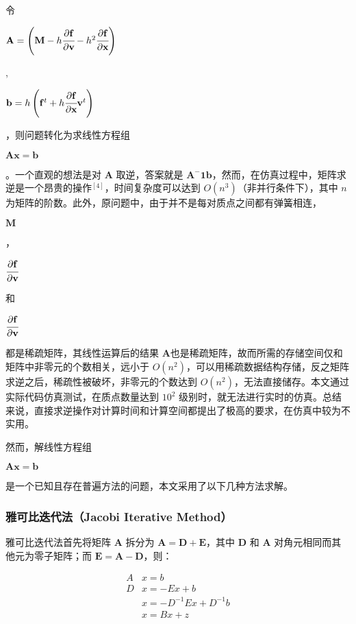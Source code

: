 \documentclass[UTF8]{ctexart}
\begin{document}
令 \begin{large}$ \mathbf{A} = \left ( \mathbf{M} - h \cfrac{\partial \mathbf{f}}{\partial \mathbf{v}} - h^2 \cfrac{\partial \mathbf{f}}{\partial \mathbf{x}} \right ) $\end{large}, \begin{large} $\mathbf{b} = h \left ( \mathbf{f}^{t} + h \cfrac{\partial \mathbf{f}}{\partial \mathbf{x}} \mathbf{v}^t \right )$ \end{large}，则问题转化为求线性方程组 \begin{large} $\mathbf{Ax = b}$ \end{large}。一个直观的想法是对 $\mathbf{A}$ 取逆，答案就是 $\mathbf{A^-1b}$，然而，在仿真过程中，矩阵求逆是一个昂贵的操作${}^{[4]}$，时间复杂度可以达到 $O(n^3)$（非并行条件下），其中 $n$ 为矩阵的阶数。此外，原问题中，由于并不是每对质点之间都有弹簧相连，\begin{large} $ \mathbf{M} $ \end{large}，\begin{large} $\cfrac{\partial \mathbf{f}}{\partial \mathbf{v}}$ \end{large} 和 \begin{large} $\cfrac{\partial \mathbf{f}}{\partial \mathbf{v}}$ \end{large} 都是稀疏矩阵，其线性运算后的结果 $\mathbf{A}$也是稀疏矩阵，故而所需的存储空间仅和矩阵中非零元的个数相关，远小于 $O(n^2)$，可以用稀疏数据结构存储，反之矩阵求逆之后，稀疏性被破坏，非零元的个数达到 $O(n^2)$，无法直接储存。本文通过实际代码仿真测试，在质点数量达到 $10^2$ 级别时，就无法进行实时的仿真。总结来说，直接求逆操作对计算时间和计算空间都提出了极高的要求，在仿真中较为不实用。 \par

然而，解线性方程组 \begin{large} $\mathbf{Ax = b}$ \end{large} 是一个已知且存在普遍方法的问题，本文采用了以下几种方法求解。

\subsubsection {雅可比迭代法（Jacobi Iterative Method）}

雅可比迭代法首先将矩阵 $\mathbf{A}$ 拆分为 $\mathbf{A=D+E}$，其中 $\mathbf{D}$ 和 $\mathbf{A}$ 对角元相同而其他元为零子矩阵；而 $\mathbf{E=A-D}$，则：

\begin{large}
\begin{equation}
\begin{split}
A&x = b \\
D&x = -Ex + b \\
&x = -D^{-1} E x + D^{-1}b \\
&x = Bx + z
\end{split}
\end{equation}
\end{large}
\end{document}
